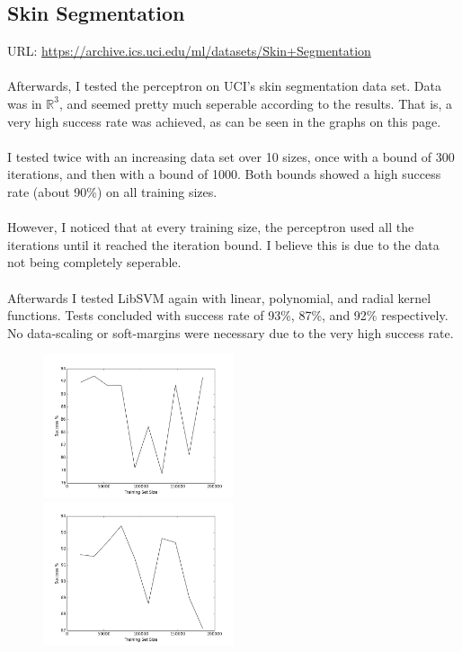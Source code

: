 \documentclass[a4paper]{article}
\begin{document}
\newpage

\subsection {Skin Segmentation}

URL: \url{https://archive.ics.uci.edu/ml/datasets/Skin+Segmentation}
\\\\
Afterwards, I tested the perceptron on UCI's skin segmentation data set.
Data was in $\mathbb{R}^3$, and seemed pretty much seperable according to the
results. That is, a very high success rate was achieved, as can be seen in the
graphs on this page.
\\\\
I tested twice with an increasing data set over 10 sizes,
once with a bound of 300 iterations, and then with a bound of 1000.
Both bounds showed a high success rate (about 90\%) on all training sizes.
\\\\
However, I noticed that at every training size,
the perceptron used all the iterations until it reached the iteration bound.
I believe this is due to the data not being completely seperable.
\\\\
Afterwards I tested LibSVM again with linear, polynomial, and radial kernel functions.
Tests concluded with success rate of 93\%, 87\%, and 92\% respectively.
No data-scaling or soft-margins were necessary due to the very high success rate.

\begin{figure}[h!]
    \includegraphics[width=0.5\textwidth]{images/300_iterations.png}
    \includegraphics[width=0.5\textwidth]{images/1000_iterations.png}
\end{figure}
\end{document}
